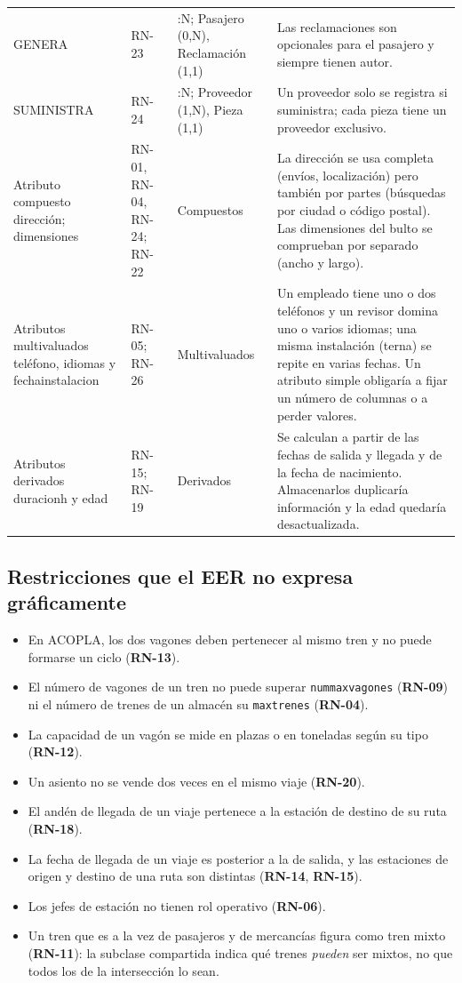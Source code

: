 \documentclass[11pt,a4paper]{article}
\DeclareRobustCommand{\_}{\textunderscore\allowbreak}
\newcommand{\RN}[1]{\textbf{RN-#1}}
\newcommand{\tb}[1]{\texttt{#1}}
\begin{document}
{\begin{longtable}{>{\raggedright\arraybackslash}p{2.9cm} >{\raggedright\arraybackslash}p{1.1cm} >{\raggedright\arraybackslash}p{3.3cm} >{\raggedright\arraybackslash}p{6.6cm}}
GENERA & RN-23 & 1:N; Pasajero (0,N), Reclamación (1,1) & Las reclamaciones son opcionales para el pasajero y siempre tienen autor. \\
SUMINISTRA & RN-24 & 1:N; Proveedor (1,N), Pieza (1,1) & Un proveedor solo se registra si suministra; cada pieza tiene un proveedor exclusivo. \\
\midrule
Atributo compuesto dirección; dimensiones & RN-01, RN-04, RN-24; RN-22 & Compuestos & La dirección se usa completa (envíos, localización) pero también por partes (búsquedas por ciudad o código postal). Las dimensiones del bulto se comprueban por separado (ancho y largo). \\
Atributos multivaluados teléfono, idiomas y fecha\_instalacion & RN-05; RN-26 & Multivaluados & Un empleado tiene uno o dos teléfonos y un revisor domina uno o varios idiomas; una misma instalación (terna) se repite en varias fechas. Un atributo simple obligaría a fijar un número de columnas o a perder valores. \\
Atributos derivados duracion\_h y edad & RN-15; RN-19 & Derivados & Se calculan a partir de las fechas de salida y llegada y de la fecha de nacimiento. Almacenarlos duplicaría información y la edad quedaría desactualizada. \\
\end{longtable}
}

\subsection{Restricciones que el EER no expresa gráficamente}
\label{sec:noexpresa}
\begin{itemize}
\item En ACOPLA, los dos vagones deben pertenecer al mismo tren y no puede formarse un ciclo (\RN{13}).
\item El número de vagones de un tren no puede superar \tb{num\_max\_vagones} (\RN{09}) ni el número de trenes de un almacén su \tb{max\_trenes} (\RN{04}).
\item La capacidad de un vagón se mide en plazas o en toneladas según su tipo (\RN{12}).
\item Un asiento no se vende dos veces en el mismo viaje (\RN{20}).
\item El andén de llegada de un viaje pertenece a la estación de destino de su ruta (\RN{18}).
\item La fecha de llegada de un viaje es posterior a la de salida, y las estaciones de origen y destino de una ruta son distintas (\RN{14}, \RN{15}).
\item Los jefes de estación no tienen rol operativo (\RN{06}).
\item Un tren que es a la vez de pasajeros y de mercancías figura como tren mixto (\RN{11}): la subclase compartida indica qué trenes \emph{pueden} ser mixtos, no que todos los de la intersección lo sean.
\end{itemize}
\end{document}
